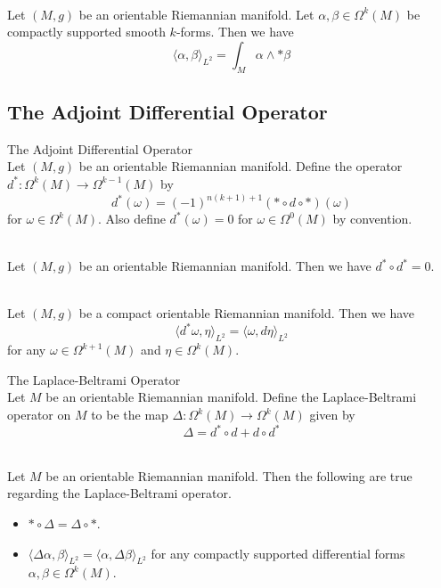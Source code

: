 \documentclass[a4paper]{article}
\begin{document}
\begin{lmm}{}{}\\
Let $(M,g)$ be an orientable Riemannian manifold. Let $\alpha,\beta\in\Omega^k(M)$ be compactly supported smooth $k$-forms. Then we have $$\langle\alpha,\beta\rangle_{L^2}=\int_M\alpha\wedge\ast\beta$$
\end{lmm}

\subsection{The Adjoint Differential Operator}
\begin{defn}{The Adjoint Differential Operator}{}\\
Let $(M,g)$ be an orientable Riemannian manifold. Define the operator $d^\ast:\Omega^k(M)\to\Omega^{k-1}(M)$ by $$d^\ast(\omega)=(-1)^{n(k+1)+1}(\ast\circ d\circ\ast)(\omega)$$ for $\omega\in\Omega^k(M)$. Also define $d^\ast(\omega)=0$ for $\omega\in\Omega^0(M)$ by convention. 
\end{defn}

\begin{lmm}{}{}\\
Let $(M,g)$ be an orientable Riemannian manifold. Then we have $d^\ast\circ d^\ast=0$. 
\end{lmm}

\begin{prp}{}{}\\
Let $(M,g)$ be a compact orientable Riemannian manifold. Then we have $$\langle d^\ast\omega,\eta\rangle_{L^2}=\langle\omega,d\eta\rangle_{L^2}$$ for any $\omega\in\Omega^{k+1}(M)$ and $\eta\in\Omega^k(M)$. 
\end{prp}

\begin{defn}{The Laplace-Beltrami Operator}{}\\
Let $M$ be an orientable Riemannian manifold. Define the Laplace-Beltrami operator on $M$ to be the map $\Delta:\Omega^k(M)\to\Omega^k(M)$ given by $$\Delta=d^\ast\circ d+d\circ d^\ast$$
\end{defn}

\begin{lmm}{}{}\\
Let $M$ be an orientable Riemannian manifold. Then the following are true regarding the Laplace-Beltrami operator. 
\begin{itemize}
\item $\ast\circ\Delta=\Delta\circ\ast$. 
\item $\langle\Delta\alpha,\beta\rangle_{L^2}=\langle\alpha,\Delta\beta\rangle_{L^2}$ for any compactly supported differential forms $\alpha,\beta\in\Omega^k(M)$. 
\end{itemize}
\end{lmm}
\end{document}
